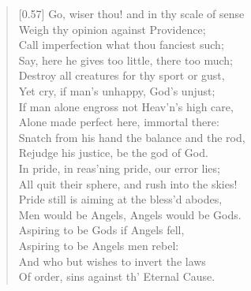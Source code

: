 \begin{verse}[0.57\textwidth]
Go, wiser thou! and in thy scale of sense\\
Weigh thy opinion against Providence;\\
Call imperfection what thou fanciest such;\\
Say, here he gives too little, there too much;\\
Destroy all creatures for thy sport or gust,\\
Yet cry, if man's unhappy, God's unjust;\\
If man alone engross not Heav'n's high care,\\
Alone made perfect here, immortal there:\\
Snatch from his hand the balance and the rod,\\
Rejudge his justice, be the god of God.\\
In pride, in reas'ning pride, our error lies;\\
All quit their sphere, and rush into the skies!\\
Pride still is aiming at the bless'd abodes,\\
Men would be Angels, Angels would be Gods.\\
Aspiring to be Gods if Angels fell,\\
Aspiring to be Angels men rebel:\\
And who but wishes to invert the laws\\
Of order, sins against th' Eternal Cause.


\end{verse}
